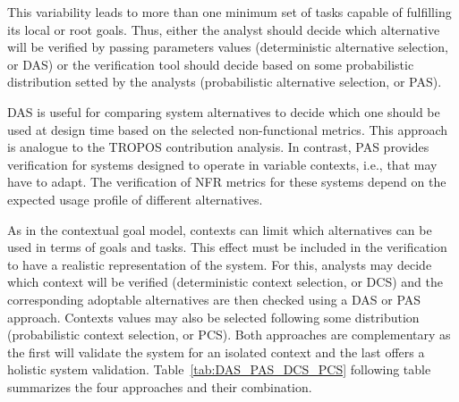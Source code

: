 This variability leads to more than one minimum set of tasks capable of fulfilling its local or root goals. Thus, either the analyst should decide which alternative will be verified by passing parameters values (deterministic alternative selection, or DAS) or the verification tool should decide based on some probabilistic distribution setted by the analysts (probabilistic alternative selection, or PAS).

DAS is useful for comparing system alternatives to decide which one should be used at design time based on the selected non-functional metrics. This approach is analogue to the TROPOS contribution analysis. In contrast, PAS provides verification for systems designed to operate in variable contexts, i.e., that may have to adapt. The verification of NFR metrics for these systems depend on the expected usage profile of different alternatives. 

As in the contextual goal model, contexts can limit which alternatives can be used in terms of goals and tasks. This effect must be included in the verification to have a realistic representation of the system. For this, analysts may decide which context will be verified (deterministic context selection, or DCS) and the corresponding adoptable alternatives are then checked using a DAS or PAS approach. Contexts values may also be selected following some distribution (probabilistic context selection, or PCS). Both approaches are complementary as the first will validate the system for an isolated context and the last offers a holistic system validation. Table~\ref{tab:DAS_PAS_DCS_PCS} following table summarizes the four approaches and their combination.

